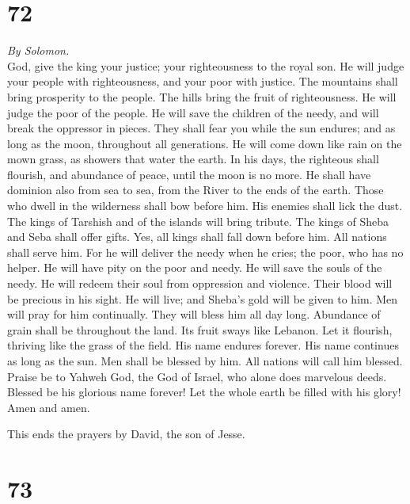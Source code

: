\hypertarget{section-71}{%
\section{72}\label{section-71}}

\emph{By Solomon.}\\
 God, give the king your justice; your righteousness to
the royal son.  He will judge your people with
righteousness, and your poor with justice.  The mountains
shall bring prosperity to the people. The hills bring the fruit of
righteousness.  He will judge the poor of the people. He
will save the children of the needy, and will break the oppressor in
pieces.  They shall fear you while the sun endures; and as
long as the moon, throughout all generations.  He will
come down like rain on the mown grass, as showers that water the earth.
 In his days, the righteous shall flourish, and abundance
of peace, until the moon is no more.  He shall have
dominion also from sea to sea, from the River to the ends of the earth.
 Those who dwell in the wilderness shall bow before him.
His enemies shall lick the dust.  The kings of Tarshish
and of the islands will bring tribute. The kings of Sheba and Seba shall
offer gifts.  Yes, all kings shall fall down before him.
All nations shall serve him.  For he will deliver the
needy when he cries; the poor, who has no helper.  He
will have pity on the poor and needy. He will save the souls of the
needy.  He will redeem their soul from oppression and
violence. Their blood will be precious in his sight.  He
will live; and Sheba's gold will be given to him. Men will pray for him
continually. They will bless him all day long.  Abundance
of grain shall be throughout the land. Its fruit sways like Lebanon. Let
it flourish, thriving like the grass of the field.  His
name endures forever. His name continues as long as the sun. Men shall
be blessed by him. All nations will call him blessed. 
Praise be to Yahweh God, the God of Israel, who alone does marvelous
deeds.  Blessed be his glorious name forever! Let the
whole earth be filled with his glory! Amen and amen.

 This ends the prayers by David, the son of Jesse.

\hypertarget{section-72}{%
\section{73}\label{section-72}}

